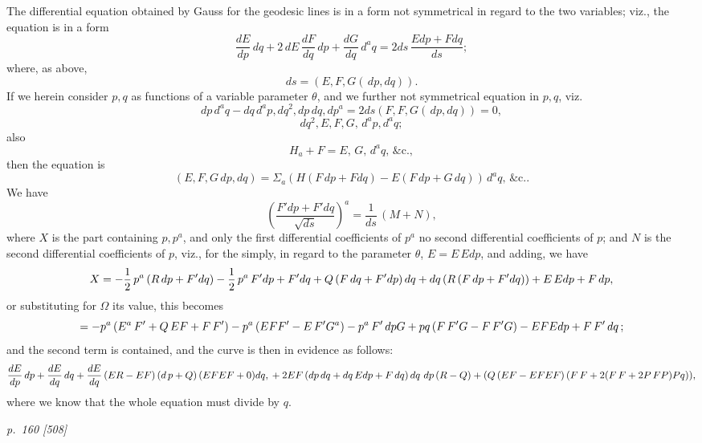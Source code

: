 \documentclass[11pt,a4paper]{book}
\begin{document}
The differential equation obtained by Gauss for the geodesic lines is in a form
not symmetrical in regard to the two variables; viz., the equation is in a form
\[
\frac{dE}{dp}\,dq + 2\,dE\,\frac{dF}{dq}\,dp + \frac{dG}{dq}\,d^a q = 2ds\,\frac{Edp + Fdq}{ds};
\]
where, as above,
\[
ds = (E, F, G(\,dp, dq)).
\]
If we herein consider $p, q$ as functions of a variable parameter $\theta$, and we further
not symmetrical equation in $p, q$, viz.\
\[
dp\,d^a q - dq\,d^a p, dq^2, dp\,dq, dp^a = 2ds(F, F, G(\,dp, dq)) = 0,
\]
\[
dq^2, E, F, G, \,d^a p, d^a q;
\]
also
\[
H_a + F = E,\,G,\,d^a q,\,\&\text{c.},
\]
then the equation is
\[
(E, F, G\,dp, dq) = \Sigma_a (H(F\,dp + Fdq) - E(F\,dp + G\,dq))\,d^a q,\,\&\text{c.}.
\]
We have
\[
\left(\frac{F'dp + F'dq}{\sqrt{ds}}\right)^a = \frac{1}{ds}\,(M + N),
\]
where $X$ is the part containing $p, p^a$, and only the first differential coefficients of $p^a$
no second differential coefficients of $p$; and $N$ is the second differential coefficients of $p$,
viz., for the simply, in regard to the parameter $\theta$, $E = E\,Edp$, and adding, we
have
\[
X = -\frac{1}{2}\,p^a\,(R\,dp + F'dq) - \frac{1}{2}\,p^a\,F'dp + F'dq + Q\,(F\,dq + F'dp)\,dq + dq\,(R\,(F\,dp + F'dq))\\
+ E\,Edp + F\,dp,
\]
or substituting for $\Omega$ its value, this becomes
\[
=-p^a\,(E^a\,F'+ Q\,EF + F\,F')-p^a\,(EF F' - E\,F' G^a)-p^a\,F'\,dp G+pq\,(F\,F' G - F\,F' G)\\
-EF Edp + F\,F'\,dq\,;
\]
and the second term is contained, and the curve is then in evidence as follows:
\[
\frac{dE}{dp}\,dp + \frac{dE}{dq}\,dq + \frac{dE}{dq}\,(ER - EF)\,(d\,p + Q)\,(EF EF + 0)dq,\\
+ 2EF\,(dp\,dq + dq\,Edp + F\,dq)\,dq\,\,dp\,(R - Q) + (Q\,(EF - EF EF)\,(F\,F + 2(F\,F + 2P\,F P)Pq)),
\]
where we know that the whole equation must divide by $q$.

\clearpage

\bigskip
\textit{p.~160 [508]}
\smallskip
\end{document}

